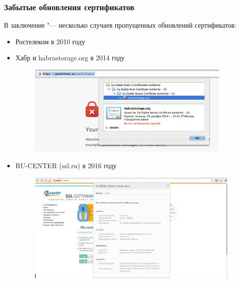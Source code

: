 \documentclass[10pt, a5paper]{article}
\begin{document}
\subsubsection*{Забытые обновления сертификатов}

В заключение "--- несколько случаев пропущенных обновлений сертификатов:

\begin{itemize}
  \item Ростелеком в 2010 году \footnotemark[7]
  \item Хабр и habrastorage.org в 2014 году \footnotemark[8]

\begin{figure}[h!]
  \centering
  \includegraphics[width=10cm]{w_03_2016_Kharkevich12.png}
  
\end{figure}

  \item RU-CENTER (ssl.ru) в 2016 году

\begin{figure}[h!]
  \centering
  \includegraphics[height=5.5cm]{w_03_2016_Kharkevich13.png}
  
\end{figure}

\end{itemize}
\end{document}
